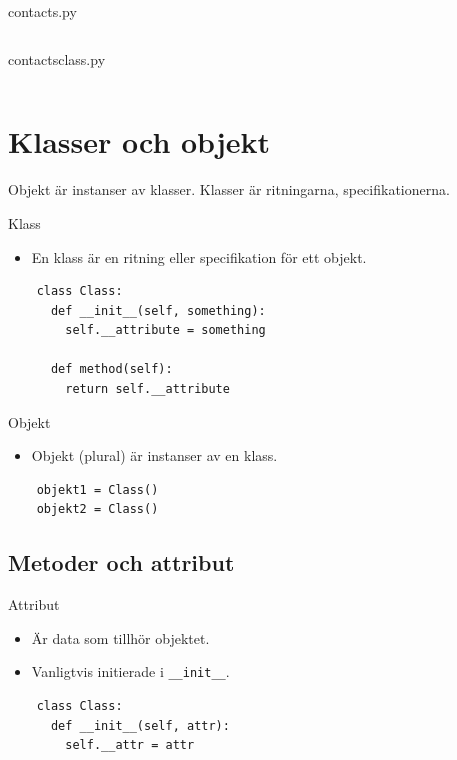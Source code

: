 \begin{frame}[fragile]
  contacts.py \hrulefill
  \inputminted[linenos,firstline=25,lastline=35]{python}{examples/contacts.py}
  \vfill
  contacts\textunderscore{}class.py \hrulefill
  \inputminted[linenos,firstline=23,lastline=25]{python}{examples/contacts_class.py}
\end{frame}



\section{Klasser och objekt}

Objekt är instanser av klasser.
Klasser är ritningarna, specifikationerna.

\begin{frame}[fragile]
  \begin{block}{Klass}
    \begin{itemize}
      \item En klass är en ritning eller specifikation för ett objekt.
    \end{itemize}
  \end{block}

  \begin{verbatim}
    class Class:
      def __init__(self, something):
        self.__attribute = something

      def method(self):
        return self.__attribute
  \end{verbatim}
\end{frame}

\begin{frame}[fragile]
  \begin{block}{Objekt}
    \begin{itemize}
      \item Objekt (plural) är instanser av en klass.
    \end{itemize}
  \end{block}

  \begin{verbatim}
    objekt1 = Class()
    objekt2 = Class()
  \end{verbatim}
\end{frame}


\subsection{Metoder och attribut}

\begin{frame}[fragile]
  \begin{block}{Attribut}
    \begin{itemize}
      \item Är data som tillhör objektet.
      \item Vanligtvis initierade i \texttt{__init__}.
    \end{itemize}
  \end{block}

  \begin{verbatim}
    class Class:
      def __init__(self, attr):
        self.__attr = attr
  \end{verbatim}
\end{frame}

